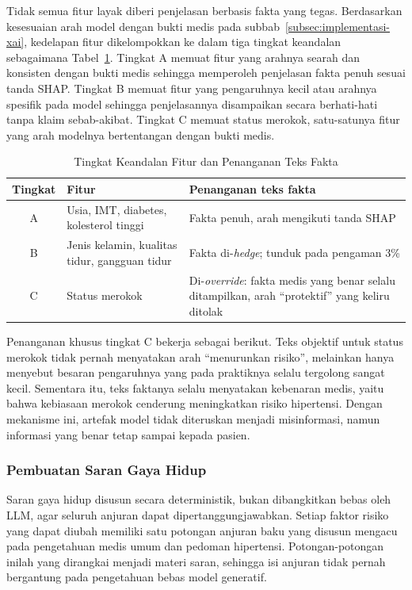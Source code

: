 Tidak semua fitur layak diberi penjelasan berbasis fakta yang tegas. Berdasarkan kesesuaian arah model dengan bukti medis pada subbab~\ref{subsec:implementasi-xai}, kedelapan fitur dikelompokkan ke dalam tiga tingkat keandalan sebagaimana Tabel~\ref{tab:tier-fitur}. Tingkat A memuat fitur yang arahnya searah dan konsisten dengan bukti medis sehingga memperoleh penjelasan fakta penuh sesuai tanda SHAP. Tingkat B memuat fitur yang pengaruhnya kecil atau arahnya spesifik pada model sehingga penjelasannya disampaikan secara berhati-hati tanpa klaim sebab-akibat. Tingkat C memuat status merokok, satu-satunya fitur yang arah modelnya bertentangan dengan bukti medis.

\begin{table}[htbp]
    \centering
    \caption{Tingkat Keandalan Fitur dan Penanganan Teks Fakta}
    \label{tab:tier-fitur}
    \begin{tabularx}{\textwidth}{@{}c l X@{}}
        \toprule
        \textbf{Tingkat} & \textbf{Fitur} & \textbf{Penanganan teks fakta} \\
        \midrule
        A & Usia, IMT, diabetes, kolesterol tinggi & Fakta penuh, arah mengikuti tanda SHAP \\
        B & Jenis kelamin, kualitas tidur, gangguan tidur & Fakta di-\emph{hedge}; tunduk pada pengaman 3\% \\
        C & Status merokok & Di-\emph{override}: fakta medis yang benar selalu ditampilkan, arah ``protektif'' yang keliru ditolak \\
        \bottomrule
    \end{tabularx}
\end{table}

Penanganan khusus tingkat C bekerja sebagai berikut. Teks objektif untuk status merokok tidak pernah menyatakan arah ``menurunkan risiko'', melainkan hanya menyebut besaran pengaruhnya yang pada praktiknya selalu tergolong sangat kecil. Sementara itu, teks faktanya selalu menyatakan kebenaran medis, yaitu bahwa kebiasaan merokok cenderung meningkatkan risiko hipertensi. Dengan mekanisme ini, artefak model tidak diteruskan menjadi misinformasi, namun informasi yang benar tetap sampai kepada pasien.

\subsubsection{Pembuatan Saran Gaya Hidup}

Saran gaya hidup disusun secara deterministik, bukan dibangkitkan bebas oleh LLM, agar seluruh anjuran dapat dipertanggungjawabkan. Setiap faktor risiko yang dapat diubah memiliki satu potongan anjuran baku yang disusun mengacu pada pengetahuan medis umum dan pedoman hipertensi. Potongan-potongan inilah yang dirangkai menjadi materi saran, sehingga isi anjuran tidak pernah bergantung pada pengetahuan bebas model generatif.

